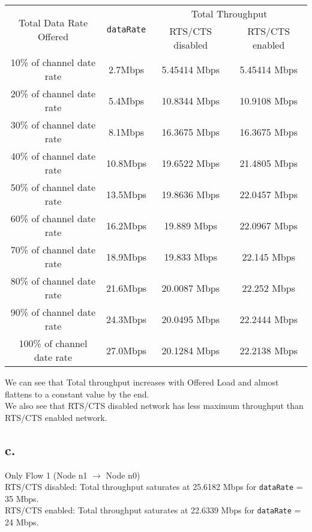 \documentclass[11pt, fleqn]{article}
\begin{document}
\begin{table}[H]
    \centering
    \begin{tabular}{||c|c||c|c||}
         \hline
         \multirow{2}{*}{Total Data Rate Offered} & \multirow{2}{*}{\texttt{dataRate}} & \multicolumn{2}{c||}{Total Throughput} \\
         & & RTS/CTS disabled & RTS/CTS enabled \\
         \hline %
         10\% of channel date rate & 2.7Mbps & 5.45414 Mbps & 5.45414 Mbps \\
         \hline %
         20\% of channel date rate & 5.4Mbps & 10.8344 Mbps & 10.9108 Mbps \\
         \hline %
         30\% of channel date rate & 8.1Mbps & 16.3675 Mbps & 16.3675 Mbps \\
         \hline %
         40\% of channel date rate & 10.8Mbps & 19.6522 Mbps & 21.4805 Mbps \\
         \hline %
         50\% of channel date rate & 13.5Mbps & 19.8636 Mbps & 22.0457 Mbps \\
         \hline %
         60\% of channel date rate & 16.2Mbps & 19.889 Mbps & 22.0967 Mbps \\
         \hline %
         70\% of channel date rate & 18.9Mbps & 19.833 Mbps & 22.145 Mbps \\
         \hline %
         80\% of channel date rate & 21.6Mbps & 20.0087 Mbps & 22.252 Mbps \\
         \hline %
         90\% of channel date rate & 24.3Mbps & 20.0495 Mbps & 22.2444 Mbps \\
         \hline %
         100\% of channel date rate & 27.0Mbps & 20.1284 Mbps & 22.2138 Mbps \\
         \hline         
    \end{tabular}
\end{table}

We can see that Total throughput increases with Offered Load and almost flattens to a constant value by the end. \\
We also see that RTS/CTS disabled network has less maximum throughput than RTS/CTS enabled network. \\

\subsection*{c.}
Only Flow 1 (Node n1 $\rightarrow$ Node n0) \\
RTS/CTS disabled: Total throughput saturates at 25.6182 Mbps for \texttt{dataRate} = 35 Mbps. \\
RTS/CTS enabled: Total throughput saturates at 22.6339 Mbps for \texttt{dataRate} = 24 Mbps. \\
\end{document}
